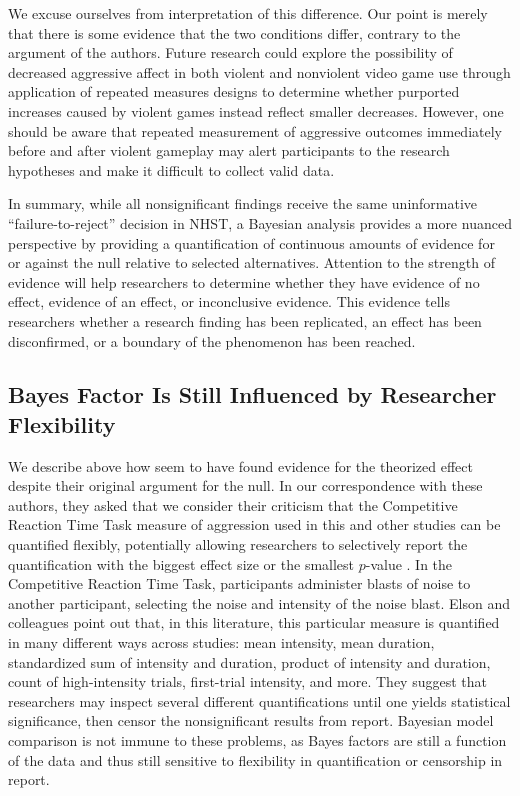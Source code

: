 \documentclass[man]{apa6}
\begin{document}
We excuse ourselves from interpretation of this difference. Our point is merely that there is some evidence that the two conditions differ, contrary to the argument of the authors. Future research could explore the possibility of decreased aggressive affect in both violent and nonviolent video game use through application of repeated measures designs to determine whether purported increases caused by violent games instead reflect smaller decreases. However, one should be aware that repeated measurement of aggressive outcomes immediately before and after violent gameplay may alert participants to the research hypotheses and make it difficult to collect valid data. 

In summary, while all nonsignificant findings receive the same uninformative ``failure-to-reject'' decision in NHST, a Bayesian analysis provides a more nuanced perspective by providing a quantification of continuous amounts of evidence for or against the null relative to selected alternatives. Attention to the strength of evidence will help researchers to determine whether they have evidence of no effect, evidence of an effect, or inconclusive evidence. This evidence tells researchers whether a research finding has been replicated, an effect has been disconfirmed, or a boundary of the phenomenon has been reached.

\subsection{Bayes Factor Is Still Influenced by Researcher Flexibility} 
We describe above how \citet{Elson:etal:2013} seem to have found evidence for the theorized effect despite their original argument for the null. In our correspondence with these authors, they asked that we consider their criticism that the Competitive Reaction Time Task measure of aggression used in this and other studies can be quantified flexibly, potentially allowing researchers to selectively report the quantification with the biggest effect size or the smallest $p$-value \citep{Elson:etal:2014}. In the Competitive Reaction Time Task, participants administer blasts of noise to another participant, selecting the noise and intensity of the noise blast. Elson and colleagues point out that, in this literature, this particular measure is quantified in many different ways across studies: mean intensity, mean duration, standardized sum of intensity and duration, product of intensity and duration, count of high-intensity trials, first-trial intensity, and more. They suggest that researchers may inspect several different quantifications until one yields statistical significance, then censor the nonsignificant results from report. Bayesian model comparison is not immune to these problems, as Bayes factors are still a function of the data and thus still sensitive to flexibility in quantification or censorship in report. 
\end{document}
